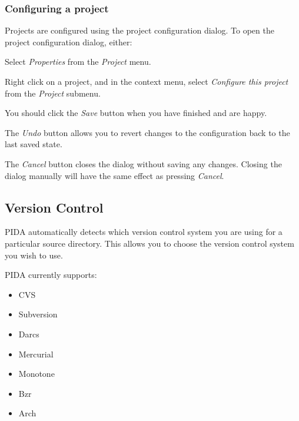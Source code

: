 \documentclass[10pt,a4paper,english]{article}
\begin{document}

\hypertarget{configuring-a-project}{}
\subsubsection*{Configuring a project}

Projects are configured using the project configuration dialog. To open the
project configuration dialog, either:
\begin{list}{.}
{
\setlength{\rightmargin}{\leftmargin}
}
\item {} 
Select \emph{Properties} from the \emph{Project} menu.

\item {} 
Right click on a project, and in the context menu, select \emph{Configure this
project} from the \emph{Project} submenu.

\end{list}

You should click the \emph{Save} button when you have finished and are happy.

The \emph{Undo} button allows you to revert changes to the configuration back to
the last saved state.

The \emph{Cancel} button closes the dialog without saving any changes. Closing the
dialog manually will have the same effect as pressing \emph{Cancel}.



\hypertarget{version-control}{}
\subsection*{Version Control}

PIDA automatically detects which version control system you are using for a
particular source directory. This allows you to choose the version control
system you wish to use.

PIDA currently supports:
\begin{itemize}
\item {} 
CVS

\item {} 
Subversion

\item {} 
Darcs

\item {} 
Mercurial

\item {} 
Monotone

\item {} 
Bzr

\item {} 
Arch

\end{itemize}
\end{document}
